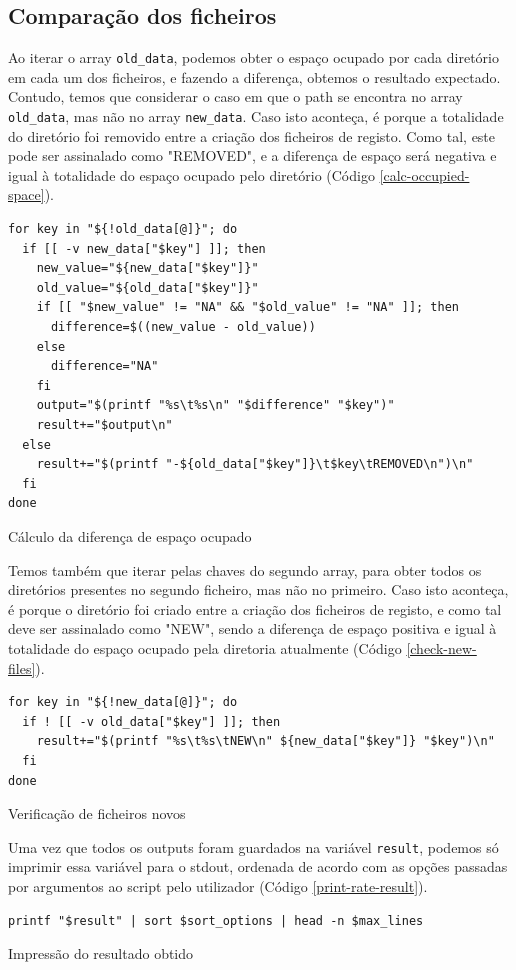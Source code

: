 \subsection{Comparação dos ficheiros}
Ao iterar o array \verb|old_data|, podemos obter o espaço
ocupado por cada diretório em cada um dos ficheiros, e
fazendo a diferença, obtemos o resultado expectado. Contudo,
temos que considerar o caso em que o path se encontra no
array \verb|old_data|, mas não no array \verb|new_data|. Caso
isto aconteça, é porque a totalidade do diretório foi
removido entre a criação dos ficheiros de registo. Como tal,
este pode ser assinalado como "REMOVED", e a diferença de
espaço será negativa e igual à totalidade do espaço ocupado pelo diretório (Código \ref{calc-occupied-space}).
\begin{listing}[H]
\begin{verbatim}
for key in "${!old_data[@]}"; do
  if [[ -v new_data["$key"] ]]; then
    new_value="${new_data["$key"]}"
    old_value="${old_data["$key"]}"
    if [[ "$new_value" != "NA" && "$old_value" != "NA" ]]; then
      difference=$((new_value - old_value))
    else
      difference="NA"
    fi
    output="$(printf "%s\t%s\n" "$difference" "$key")"
    result+="$output\n"
  else
    result+="$(printf "-${old_data["$key"]}\t$key\tREMOVED\n")\n"
  fi
done
\end{verbatim}
\caption{Cálculo da diferença de espaço ocupado}
\label{calc-occupied-space}
\end{listing}
Temos também que iterar pelas chaves do segundo array,
para obter todos os diretórios presentes no segundo
ficheiro, mas não no primeiro.
Caso isto aconteça, é porque o diretório foi criado entre a
criação dos ficheiros de registo, e como tal deve ser
assinalado como "NEW", sendo a diferença de espaço positiva
e igual à totalidade do espaço ocupado pela diretoria
atualmente (Código \ref{check-new-files}).
\begin{listing}[H]
\begin{verbatim}
for key in "${!new_data[@]}"; do
  if ! [[ -v old_data["$key"] ]]; then
    result+="$(printf "%s\t%s\tNEW\n" ${new_data["$key"]} "$key")\n"
  fi
done
\end{verbatim}
\caption{Verificação de ficheiros novos}
\label{check-new-files}
\end{listing}
Uma vez que todos os outputs foram guardados na variável
\verb|result|, podemos só imprimir essa variável para o
stdout, ordenada de acordo com as opções passadas por
argumentos ao script pelo utilizador (Código \ref{print-rate-result}).
\begin{listing}[H]
\begin{verbatim}
printf "$result" | sort $sort_options | head -n $max_lines
\end{verbatim}
\caption{Impressão do resultado obtido}
\label{print-rate-result}
\end{listing}

